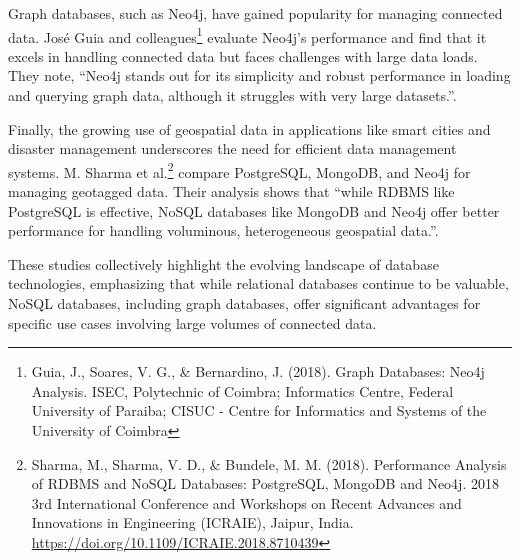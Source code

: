 Graph databases, such as Neo4j, have gained popularity for managing connected data. José Guia and colleagues\footnote{Guia, J., Soares, V. G., \& Bernardino, J. (2018). Graph Databases: Neo4j Analysis. ISEC, Polytechnic of Coimbra; Informatics Centre, Federal University of Paraiba; CISUC - Centre for Informatics and Systems of the University of Coimbra} evaluate Neo4j's performance and find that it excels in handling connected data but faces challenges with large data loads. They note, “Neo4j stands out for its simplicity and robust performance in loading and querying graph data, although it struggles with very large datasets.”.

Finally, the growing use of geospatial data in applications like smart cities and disaster management underscores the need for efficient data management systems. M. Sharma et al.\footnote{Sharma, M., Sharma, V. D., \& Bundele, M. M. (2018). Performance Analysis of RDBMS and NoSQL Databases: PostgreSQL, MongoDB and Neo4j. 2018 3rd International Conference and Workshops on Recent Advances and Innovations in Engineering (ICRAIE), Jaipur, India. \protect\url{https://doi.org/10.1109/ICRAIE.2018.8710439}} compare PostgreSQL, MongoDB, and Neo4j for managing geotagged data. Their analysis shows that “while RDBMS like PostgreSQL is effective, NoSQL databases like MongoDB and Neo4j offer better performance for handling voluminous, heterogeneous geospatial data.”.

These studies collectively highlight the evolving landscape of database technologies, emphasizing that while relational databases continue to be valuable, NoSQL databases, including graph databases, offer significant advantages for specific use cases involving large volumes of connected data.